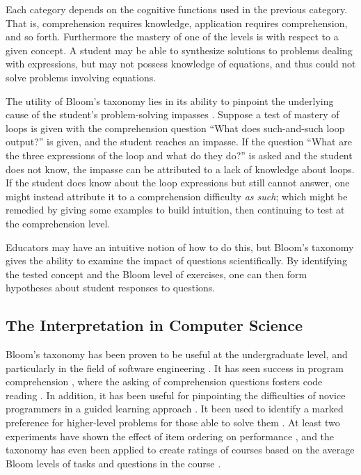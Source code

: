 Each category depends on the cognitive functions used in the previous category.
That is, comprehension requires knowledge, application requires comprehension,
and so forth.  Furthermore the mastery of one of the levels is with respect to
a given concept.  A student may be able to synthesize solutions to problems
dealing with expressions, but may not possess knowledge of equations, and thus
could not solve problems involving equations.

The utility of Bloom's taxonomy lies in its ability to pinpoint the underlying
cause of the student's problem-solving impasses \cite{shuhidan2011}.  Suppose a
test of mastery of loops is given with the comprehension question ``What does
such-and-such loop output?'' is given, and the student reaches an impasse.  If
the question ``What are the three expressions of the loop and what do they
do?'' is asked and the student does not know, the impasse can be attributed to
a lack of knowledge about loops.  If the student does know about the loop
expressions but still cannot answer, one might instead attribute it to a
comprehension difficulty \emph{as such}; which might be remedied by giving some
examples to build intuition, then continuing to test at the comprehension
level.

Educators may have an intuitive notion of how to do this, but Bloom's taxonomy
gives the ability to examine the impact of questions scientifically.  By
identifying the tested concept and the Bloom level of exercises, one can then
form hypotheses about student responses to questions.  

\subsection{The Interpretation in Computer Science}

Bloom's taxonomy has been proven to be useful at the undergraduate level, and
particularly in the field of software engineering \cite{britto2015,
mahmood2014}.  It has seen success in program comprehension
\cite{buckley2003}, where the asking of comprehension questions fosters code
reading \cite{losada2008}. In addition, it has been useful for pinpointing the
difficulties of novice programmers in a guided learning approach
\cite{shuhidan2011}.  It been used to identify a marked preference for
higher-level problems for those able to solve them \cite{bruyn2011}
\cite{goel2004}.  At least two experiments have shown the effect of item
ordering on performance \cite{newman1988effect,castleberry2016effect}, and the
taxonomy has even been applied to create ratings of courses based on the
average Bloom levels of tasks and questions in the course
\cite{oliver2004course}.

